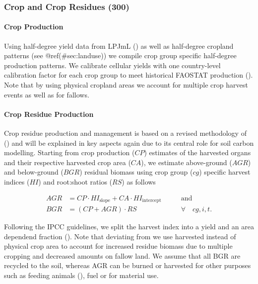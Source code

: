 \documentclass[gc, manuscript]{copernicus}
\begin{document}
\hypertarget{sec:residues}{%
\subsubsection{Crop and Crop Residues (300)}\label{sec:residues}}

\paragraph{Crop Production}

Using half-degree yield data from LPJmL (\citep{LPJmL4_1}) as well as
half-degree cropland patterns (see @ref(\#sec:landuse)) we compile crop
group specific half-degree production patterns. We calibrate cellular
yields with one country-level calibration factor for each crop group to
meet historical FAOSTAT production (\citep{FAOSTAT}). Note that by using
physical cropland areas we account for multiple crop harvest events as
well as for fallows.

\paragraph{Crop Residue Production}

Crop residue production and management is based on a revised methodology
of (\citep{bodirsky2012}) and will be explained in key aspects again due
to its central role for soil carbon modelling. Starting from crop
production (\(CP\)) estimates of the harvested organs and their
respective harvested crop area (\(CA\)), we estimate above-ground
(\(AGR\)) and below-ground (\(BGR\)) residual biomass using crop group
(\(cg\)) specific harvest indices (\(HI\)) and root:shoot ratios
(\(RS\)) as follows

\begin{equation}
\begin{aligned}
AGR & = CP \cdot HI_{\textrm{slope}} + CA \cdot HI_{\textrm{intercept}}\qquad & \textrm{and} \\
BGR & = (CP + AGR) \cdot RS \qquad                                            & \forall\quad cg, i, t.
\label{eq:resbiomass}
\end{aligned}
\end{equation}

Following the IPCC guidelines, we split the harvest index into a yield
and an area dependend fraction (\citep{ipcc_2006_2006}). Note that
deviating from \citep{bodirsky2012} we use harvested instead of physical
crop area to account for increased residue biomass due to multiple
cropping and decreased amounts on fallow land. We assume that all BGR
are recycled to the soil, whereas AGR can be burned or harvested for
other purposes such as feeding animals (\citep{weindl}), fuel or for
material use.
\end{document}
